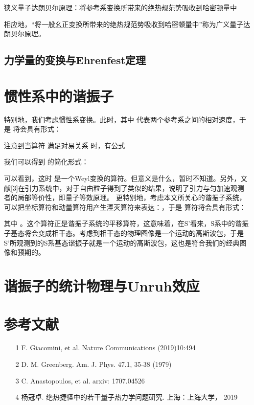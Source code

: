 \documentclass[a4paper]{article}
\begin{document}
            狭义量子达朗贝尔原理：将参考系变换所带来的绝热规范势吸收到哈密顿量中

            相应地，“将一般幺正变换所带来的绝热规范势吸收到哈密顿量中”称为广义量子达朗贝尔原理。
        


        \subsection{力学量的变换与Ehrenfest定理}



    \section{惯性系中的谐振子}
        特别地，我们考虑惯性系变换。此时，其中 代表两个参考系之间的相对速度，于是 将会具有形式：
        
        注意到当算符 满足对易关系 时，有公式
        
        我们可以得到 的简化形式：
        
        可以看到，这时 是一个Weyl变换的算符。但意义是什么，暂时不知道。另外，文献[3]在引力系统中，对于自由粒子得到了类似的结果，说明了引力与匀加速观测者的局部等价性，即量子等效原理。
        更特别地，考虑本文所关心的谐振子系统，可以把坐标算符和动量算符用产生湮灭算符来表达：，于是 算符将会具有形式：
        
        其中 。这个算符正是谐振子系统的平移算符，这意味着，在S’看来，S系中的谐振子基态将会变成相干态。考虑到相干态的物理图像是一个运动的高斯波包，于是S’所观测到的S系基态谐振子就是一个运动的高斯波包，这也是符合我们的经典图像和预期的。
    
    



    \section{谐振子的统计物理与Unruh效应}





    \section*{参考文献}
    \begin{itemize}
        \item[1] F. Giacomini, et al. Nature Communications (2019)10:494
        \item[2] D. M. Greenberg. Am. J. Phys. 47.1, 35-38 (1979)
        \item[3] C. Anastopoulos, et al. arxiv: 1707.04526
        \item[4] 杨冠卓. 绝热捷径中的若干量子热力学问题研究. 上海：上海大学， 2019
    \end{itemize}
\end{document}
